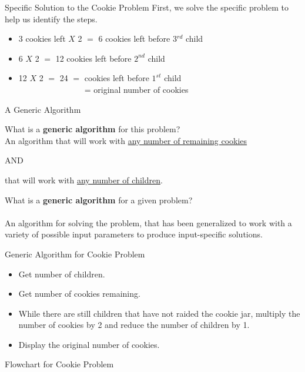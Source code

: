 \documentclass[graphics]{beamer}
\begin{document}
\begin{frame}{Specific Solution to the Cookie Problem}
    First, we solve the specific problem to help us identify the steps.
    \begin{itemize}
        \item 3 cookies left $X$ 2 $=$ 6 cookies left before 3$^{rd}$ child
        \item 6 $X$ 2 $=$ 12 cookies left before $2^{nd}$ child
        \item 12 $X$ 2 $=$ 24 $=$ cookies left before $1^{st}$ child \\
        ~~ ~~ ~~ ~~ ~~ ~~ = original number of cookies
    \end{itemize}
\end{frame}

\begin{frame}{A Generic Algorithm}
     {
        What is a \textbf{generic algorithm} for this problem? \\
        An algorithm that will work with \underline{any number of remaining cookies}
        \begin{center}
    				        AND
    	\end{center}
    	that will work with \underline{any number of children}.
	}
	 {
	    What is a \textbf{generic algorithm} for a given problem? \\ ~~ \\
	    
	    An algorithm for solving the problem, that has been generalized to work with a variety of possible input parameters to produce input-specific solutions.
	}
\end{frame}

\begin{frame}{Generic Algorithm for Cookie Problem}
    \begin{itemize}
        \item Get number of children.
        \item Get number of cookies remaining.
        \item While there are still children that have not raided the cookie jar, multiply the number of cookies by 2 and reduce the number of children by 1.
        \item Display the original number of cookies.
    \end{itemize}
\end{frame}

\begin{frame}{Flowchart for Cookie Problem}
    \centering
    
\end{frame}
\end{document}
